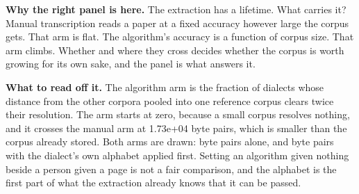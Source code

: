 \textbf{Why the right panel is here.} The extraction has a lifetime. What carries it? Manual transcription reads a paper at a fixed accuracy however large the corpus gets. That arm is flat. The algorithm's accuracy is a function of corpus size. That arm climbs. Whether and where they cross decides whether the corpus is worth growing for its own sake, and the panel is what answers it.

\textbf{What to read off it.} The algorithm arm is the fraction of dialects whose distance from the other corpora pooled into one reference corpus clears twice their resolution. The arm starts at zero, because a small corpus resolves nothing, and it crosses the manual arm at 1.73e+04 byte pairs, which is smaller than the corpus already stored. Both arms are drawn: byte pairs alone, and byte pairs with the dialect's own alphabet applied first. Setting an algorithm given nothing beside a person given a page is not a fair comparison, and the alphabet is the first part of what the extraction already knows that it can be passed.

